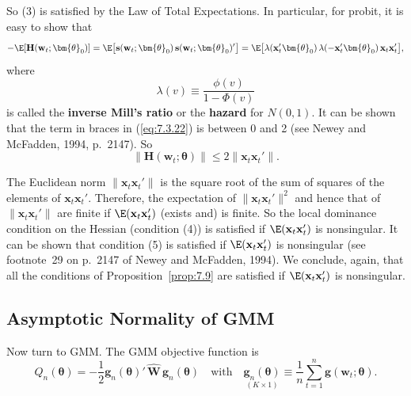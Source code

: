 \begin{example}
So (3) is satisfied by the Law of Total Expectations. In particular, for probit, it is easy to show that
\begin{equation}
\label{eq:7.3.24}
-\E[\mathbf{H}(\mathbf{w}_t; \bm{\theta}_0)] = \E\bigl[\mathbf{s}(\mathbf{w}_t; \bm{\theta}_0)\,\mathbf{s}(\mathbf{w}_t; \bm{\theta}_0)'\bigr] = \E\bigl[\lambda(\mathbf{x}_t'\bm{\theta}_0)\,\lambda(-\mathbf{x}_t'\bm{\theta}_0)\,\mathbf{x}_t \mathbf{x}_t'\bigr],
\end{equation}
where
\begin{equation}
\label{eq:7.3.25}
\lambda(v) \equiv \frac{\phi(v)}{1 - \Phi(v)}
\end{equation}
is called the \textbf{inverse Mill's ratio} or the \textbf{hazard} for $N(0,1)$. It can be shown that the term in braces in (\ref{eq:7.3.22}) is between 0 and 2 (see Newey and McFadden, 1994, p.~2147). So
\begin{equation}
\label{eq:7.3.26}
\|\mathbf{H}(\mathbf{w}_t; \bm{\theta})\| \leq 2 \|\mathbf{x}_t \mathbf{x}_t'\|.
\end{equation}

The Euclidean norm $\|\mathbf{x}_t \mathbf{x}_t'\|$ is the square root of the sum of squares of the elements of $\mathbf{x}_t \mathbf{x}_t'$. Therefore, the expectation of $\|\mathbf{x}_t \mathbf{x}_t'\|^2$ and hence that of $\|\mathbf{x}_t \mathbf{x}_t'\|$ are finite if $\E(\mathbf{x}_t \mathbf{x}_t')$ (exists and) is finite. So the local dominance condition on the Hessian (condition (4)) is satisfied if $\E(\mathbf{x}_t \mathbf{x}_t')$ is nonsingular. It can be shown that condition (5) is satisfied if $\E(\mathbf{x}_t \mathbf{x}_t')$ is nonsingular (see footnote~29 on p.~2147 of Newey and McFadden, 1994). We conclude, again, that all the conditions of Proposition~\ref{prop:7.9} are satisfied if $\E(\mathbf{x}_t \mathbf{x}_t')$ is nonsingular.
\end{example}

\subsection*{Asymptotic Normality of GMM}

Now turn to GMM. The GMM objective function is
\begin{equation}
\label{eq:7.3.27}
Q_n(\bm{\theta}) = -\frac{1}{2}\mathbf{g}_n(\bm{\theta})'\,\widehat{\mathbf{W}}\,\mathbf{g}_n(\bm{\theta}) \quad \text{with} \quad \underset{(K \times 1)}{\mathbf{g}_n(\bm{\theta})} \equiv \frac{1}{n}\sum_{t=1}^{n}\mathbf{g}(\mathbf{w}_t; \bm{\theta}).
\end{equation}

